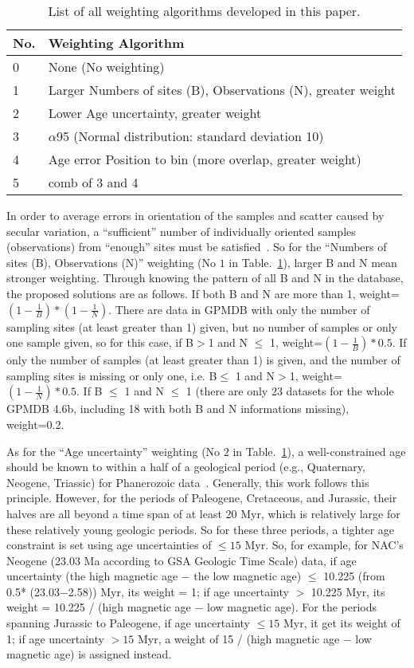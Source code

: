 \begin{table}
\centering
\caption{List of all weighting algorithms developed in this
         paper.}\label{tab-weit}
\begin{tabular}{@{}ll@{}}
\toprule
No. & Weighting Algorithm \\ \midrule
0 & None (No weighting) \\
1 & Larger Numbers of sites (B), Observations (N), greater weight \\
2 & Lower Age uncertainty, greater weight \\
3 & $\alpha$95 (Normal distribution: standard deviation 10) \\
4 & Age error Position to bin (more overlap, greater weight) \\
5 & comb of 3 and 4 \\ \bottomrule
\end{tabular}
\end{table}

In order to average errors in orientation of the samples and scatter caused by
secular variation, a ``sufficient'' number of individually oriented samples
(observations) from ``enough'' sites must be satisfied~\cite{T18,v90,B02}. So
for the ``Numbers of sites (B), Observations (N)'' weighting (No $1$ in
Table.~\ref{tab-weit}), larger B and N mean stronger weighting. Through knowing
the pattern of all B and N in the database, the proposed solutions are as
follows. If both B and N are more than 1, weight=$(1- \frac{1}{B})*(1-
\frac{1}{N})$. There are data in GPMDB with only the number of sampling sites
(at least greater than 1) given, but no number of samples or only one sample
given, so for this case, if B$>$1 and N $\leq$ 1, weight=$(1- \frac{1}{B})*0.5$.
If only the number of samples (at least greater than 1) is given, and the
number of sampling sites is missing or only one, i.e. B$\leq$ 1 and N$>$1,
weight=$(1- \frac{1}{N})*0.5$. If B $\leq$ 1 and N $\leq$ 1 (there are only 23
datasets for the whole GPMDB 4.6b, including 18 with both B and N informations
missing), weight=0.2.

As for the ``Age uncertainty'' weighting (No $2$ in Table.~\ref{tab-weit}), a
well-constrained age should be known to within a half of a geological period
(e.g., Quaternary, Neogene, Triassic) for Phanerozoic data~\cite{v90,T18}.
Generally, this work follows this principle. However, for the periods of
Paleogene, Cretaceous, and Jurassic, their halves are all beyond a time span of
at least 20 Myr, which is relatively large for these relatively young geologic
periods. So for these three periods, a tighter age constraint is set using age
uncertainties of $\leq15$ Myr. So, for example, for NAC's Neogene
(23.03 Ma according to GSA Geologic Time Scale) data, if age
uncertainty (the high magnetic age $-$ the low magnetic age) $\leq$ 10.225 (from
0.5* (23.03$-$2.58)) Myr, its weight = 1; if age uncertainty $>$ 10.225 Myr, its
weight = 10.225 / (high magnetic age $-$ low magnetic age). For the periods
spanning Jurassic to Paleogene, if age uncertainty $\leq15$ Myr, it get its
weight of 1; if age uncertainty $>15$ Myr, a weight of 15 / (high magnetic age
$-$ low magnetic age) is assigned instead.

